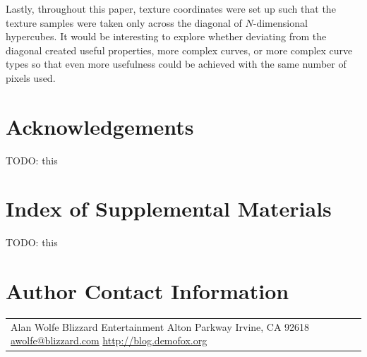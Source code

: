 \documentclass{jcgt}
\begin{document}
Lastly, throughout this paper, texture coordinates were set up such that the texture samples were taken only across the diagonal of $N$-dimensional hypercubes.  It would be interesting to explore whether deviating from the diagonal created useful properties, more complex curves, or more complex curve types so that even more usefulness could be achieved with the same number of pixels used.

\section*{Acknowledgements}
\label{sec:acknowledgements}
TODO: this


\small



\section*{Index of Supplemental Materials}
\label{sec:indexofsupplementalmaterials}
TODO: this


\section*{Author Contact Information}

\hspace{-2mm}\begin{tabular}{p{}p{}}
Alan Wolfe \newline
Blizzard Entertainment \newline
16215 Alton Parkway \newline
Irvine, CA 92618 \newline
\href{mailto:awolfe@blizzard.com}{awolfe@blizzard.com}
\href{http://blog.demofox.org}{http://blog.demofox.org}
\end{tabular}


\afterdoc
\end{document}
